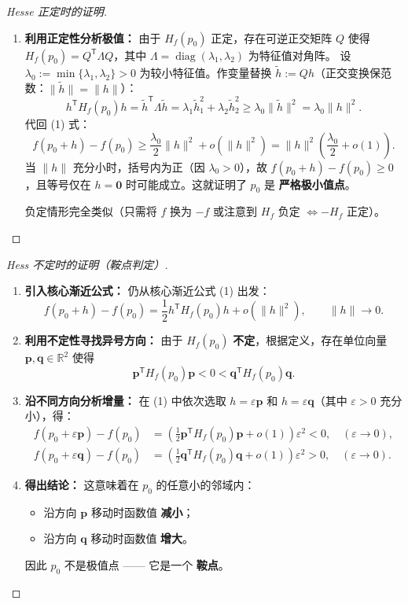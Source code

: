\documentclass[lang=cn,11pt]{elegantbook}
\begin{document}
\begin{proof}[Hesse 正定时的证明]
\begin{enumerate}
  \item \textbf{利用正定性分析极值：}
  由于 $H_f(p_0)$ 正定，存在可逆正交矩阵 $Q$ 使得 $H_f(p_0)=Q^{\mathsf T}\Lambda Q$，其中 $\Lambda=\operatorname{diag}(\lambda_1,\lambda_2)$ 为特征值对角阵。
  设 $\lambda_0:=\min\{\lambda_1,\lambda_2\}>0$ 为较小特征值。作变量替换 $\tilde h:=Qh$（正交变换保范数：$\|\tilde h\|=\|h\|$）：
  \[
  h^{\mathsf T}H_f(p_0)h=\tilde h^{\mathsf T}\Lambda\tilde h =\lambda_1\tilde h_1^2+\lambda_2\tilde h_2^2 \geq\lambda_0\|\tilde h\|^2=\lambda_0\|h\|^2.
  \]
  代回 (1) 式：
  \[
  f(p_0+h)-f(p_0) \geq\frac{\lambda_0}{2}\|h\|^2+o(\|h\|^2) =\|h\|^2\!\left(\frac{\lambda_0}{2}+o(1)\right).
  \]
  当 $\|h\|$ 充分小时，括号内为正（因 $\lambda_0>0$），故 $f(p_0+h)-f(p_0)\geq 0$，且等号仅在 $h=\boldsymbol 0$ 时可能成立。这就证明了 $p_0$ 是 \textbf{严格极小值点}。

  负定情形完全类似（只需将 $f$ 换为 $-f$ 或注意到 $H_f$ 负定 $\Longleftrightarrow -H_f$ 正定）。
\end{enumerate}
\end{proof}

\begin{proof}[Hess 不定时的证明（鞍点判定）] \label{proof:hessian-indefinite-proof}
\begin{enumerate}
  \item \textbf{引入核心渐近公式：}
  仍从核心渐近公式 (1) 出发：
  \[
  f(p_0+h)-f(p_0)=\frac{1}{2} h^{\mathsf T}H_f(p_0)h+o(\|h\|^2),\qquad \|h\|\to 0.
  \]

  \item \textbf{利用不定性寻找异号方向：}
  由于 $H_f(p_0)$ \textbf{不定}，根据定义，存在单位向量 $\boldsymbol p, \boldsymbol q\in\mathbb R^2$ 使得
  \[
  \boldsymbol p^{\mathsf T}H_f(p_0)\boldsymbol p<0 <\boldsymbol q^{\mathsf T}H_f(p_0)\boldsymbol q.
  \]

  \item \textbf{沿不同方向分析增量：}
  在 (1) 中依次选取 $h=\varepsilon\boldsymbol p$ 和 $h=\varepsilon\boldsymbol q$（其中 $\varepsilon>0$ 充分小），得：
  \begin{align*}
  f(p_0+\varepsilon\boldsymbol p)-f(p_0) &= \left(\frac{1}{2}\boldsymbol p^{\mathsf T}H_f(p_0)\boldsymbol p+o(1)\right)\varepsilon^2 < 0, \quad (\varepsilon\to 0),\\[6pt]
  f(p_0+\varepsilon\boldsymbol q)-f(p_0) &= \left(\frac{1}{2}\boldsymbol q^{\mathsf T}H_f(p_0)\boldsymbol q+o(1)\right)\varepsilon^2 > 0, \quad (\varepsilon\to 0).
  \end{align*}

  \item \textbf{得出结论：}
  这意味着在 $p_0$ 的任意小的邻域内：
  \begin{itemize}
    \item 沿方向 $\boldsymbol p$ 移动时函数值 \textbf{减小}；
    \item 沿方向 $\boldsymbol q$ 移动时函数值 \textbf{增大}。
  \end{itemize}
  因此 $p_0$ 不是极值点 —— 它是一个 \textbf{鞍点}。
\end{enumerate}
\end{proof}
\end{document}
